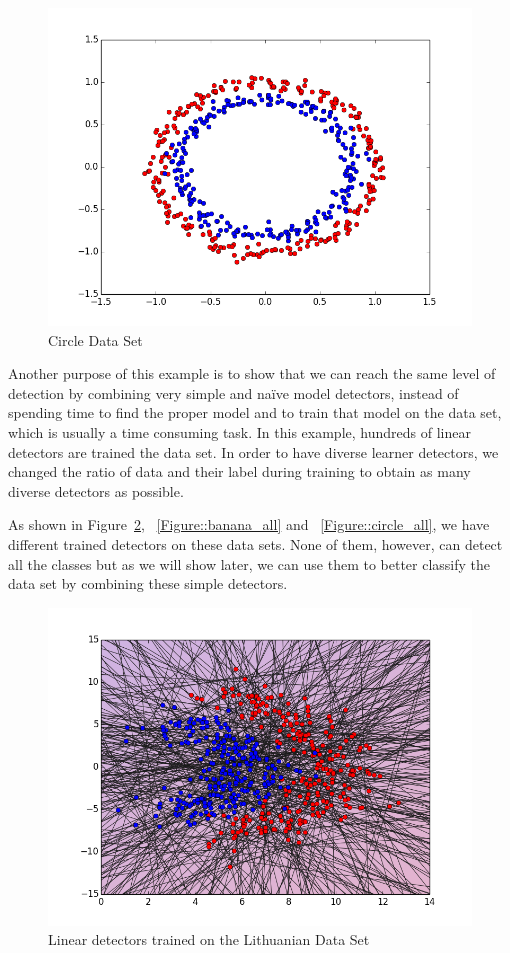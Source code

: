 \begin{figure}[]
\centering
\includegraphics[scale=0.6]{figs/dataset_Circle}
\caption{Circle Data Set}
\label{Figure::circle}
\end{figure}

Another purpose of this example is to show that we can reach the same level of detection by combining very simple and naïve model detectors, instead of spending time to find the proper model and to train that model on the data set, which is usually a time consuming task. In this example, hundreds of linear detectors  are trained the data set. In order to have diverse learner detectors, we changed the ratio of data and their label during training to obtain as many diverse detectors as possible.

As shown in Figure~\ref{Figure::lithuanian_all}, ~\ref{Figure::banana_all} and ~\ref{Figure::circle_all}, we have different trained detectors on these data sets. None of them, however, can detect all the classes but as we will show later, we can use them to better classify the data set by combining these simple detectors.

\begin{figure}[H]
\centering
\includegraphics[scale=0.6]{figs/AllClassifiersLithuanian}
\caption{Linear detectors trained on the Lithuanian Data Set}
\label{Figure::lithuanian_all}
\end{figure}

